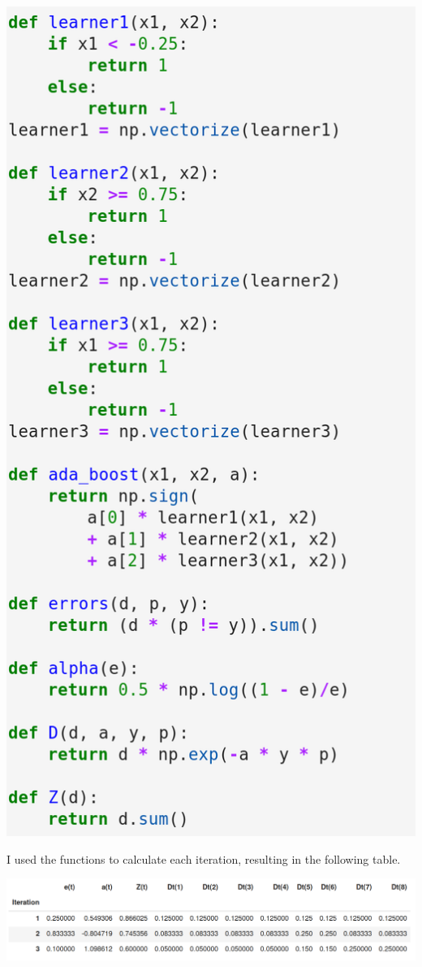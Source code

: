 \documentclass[twoside,10pt]{article}
\begin{document}
\begin{enumerate}
\begin{enumerate}
\includegraphics[scale=0.25]{functions}

I used the functions to calculate each iteration, resulting in the following table.

\includegraphics[scale=0.3]{adaboost_iterations}


\end{enumerate}
\end{enumerate}
\end{document}

